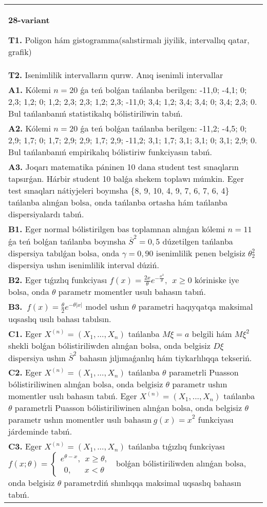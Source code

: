 \documentclass{article}
\begin{document}
\begin{tabular}{m{17cm}}
\textbf{28-variant}
\newline

\textbf{T1.} 
Poligon hám gistogramma(salıstirmalı jiyilik, intervallıq qatar, grafik)
 \\
\textbf{T2.} 
Isenimlilik intervalların qurıw. Anıq isenimli intervallar
 \\
\textbf{A1.} 
Kólemi \(n = 20\) ǵa teń bolǵan tańlanba berilgen: -11,0; -4,1; 0; 2,3; 1,2; 0; 1,2; 2,3; 2,3; 1,2; 2,3; -11,0; 3,4; 1,2; 3,4; 3,4; 0; 3,4; 2,3; 0. Bul tańlanbanıń statistikalıq bólistiriliwin tabıń.
 \\
\textbf{A2.} 
Kólemi \(n = 20\) ǵa teń bolǵan tańlanba berilgen: -11,2; -4,5; 0; 2,9; 1,7; 0; 1,7; 2,9; 2,9; 1,7; 2,9; -11,2; 3,1; 1,7; 3,1; 3,1; 0; 3,1; 2,9; 0. Bul tańlanbanıń empirikalıq bólistiriw funkciyasın tabıń.
 \\
\textbf{A3.} 
Joqarı matematika páninen 10 dana student test sınaqların tapsırǵan. Hárbir student 10 balǵa shekem toplawı múmkin. Eger test sınaqları nátiyjeleri boyınsha \{8, 9, 10, 4, 9, 7, 6, 7, 6, 4\} tańlanba alınǵan bolsa, onda tańlanba ortasha hám tańlanba dispersiyalardı tabıń.
 \\
\textbf{B1.} 
Eger normal bólistirilgen bas toplamnan alınǵan kólemi \(n = 11\) ǵa teń bolǵan tańlanba boyınsha \({\overline{S}}^{2} = 0,5\) dúzetilgen tańlanba dispersiya tabılǵan bolsa, onda \(\gamma = 0,90\) isenimlilik penen belgisiz \(\theta_{2}^{2}\) dispersiya ushın isenimlilik interval dúziń.
 \\
\textbf{B2.} 
Eger tıǵızlıq funkciyası \(f(x) = \frac{2x}{\theta}e^{- \frac{x^{2}}{\theta}},\ \ x \geq 0\) kóriniske iye bolsa, onda \(\theta\) parametr momentler usulı bahasın tabıń.
 \\
\textbf{B3.} 
\(\ f(x) = \frac{\theta}{2}e^{- \theta|x|}\) model ushın \(\theta\) parametri haqıyqatqa maksimal uqsaslıq usılı bahası tabılsın.
 \\
\textbf{C1.} 
Eger \(X^{(n)} = \left( X_{1},...,X_{n} \right)\) tańlanba \(M\xi = a\) belgili hám \(M\xi^{2}\) shekli bolǵan bólistiriliwden alınǵan bolsa, onda belgisiz \(D\xi\) dispersiya ushın \({\overline{S}}^{2}\) bahasın jıljımaǵanlıq hám tiykarlılıqqa tekseriń.
 \\
\textbf{C2.} 
Eger \(X^{(n)} = \left( X_{1},...,X_{n} \right)\) tańlanba \(\theta\) parametrli Puasson bólistiriliwinen alınǵan bolsa, onda belgisiz \(\theta\) parametr ushın momentler usılı bahasın tabıń. Eger \(X^{(n)} = \left( X_{1},...,X_{n} \right)\) tańlanba \(\theta\) parametrli Puasson bólistiriliwinen alınǵan bolsa, onda belgisiz \(\theta\) parametr ushın momentler usılı bahasın\({\ g(x) = x}^{2}\) funkciyası járdeminde tabıń.
 \\
\textbf{C3.} 
Eger \(X^{(n)} = \left( X_{1},...,X_{n} \right)\) tańlanba tıǵızlıq funkciyası
$f(x;\theta) = \left\{ \begin{matrix}
e^{\theta - x},\ \ x \geq \theta, \\
\ \ 0,\ \ \ \ \ \ \ x < \theta
\end{matrix} \right.\ $
bolǵan bólistiriliwden alınǵan bolsa, onda belgisiz \(\theta\) parametrdiń shınlıqqa maksimal uqsaslıq bahasın tabıń.
 \\


\end{tabular}
\end{document}
